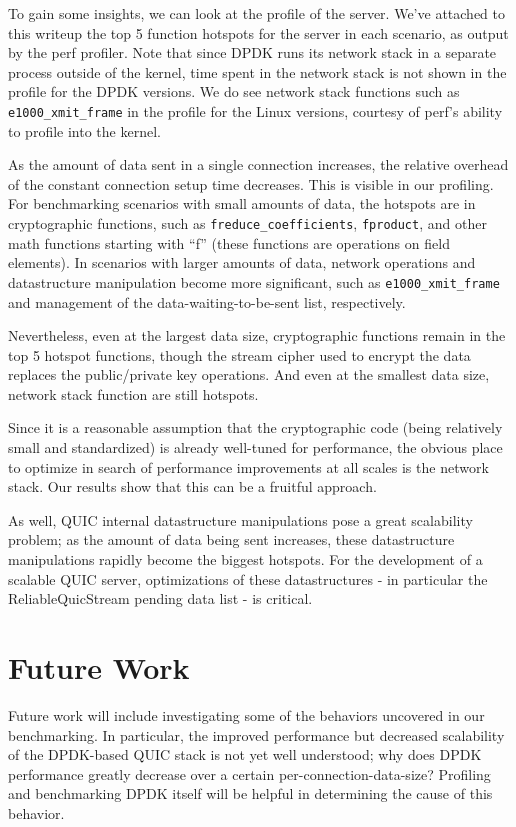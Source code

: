 \documentclass{sig-alternate-05-2015}
\begin{document}
To gain some insights, we can look at the profile of the server.
We've attached to this writeup the top 5 function hotspots for the server in each scenario,
as output by the perf profiler.
Note that since DPDK runs its network stack in a separate process outside of the kernel,
time spent in the network stack is not shown in the profile for the DPDK versions.
We do see network stack functions such as \verb|e1000_xmit_frame| in the profile for the Linux versions,
courtesy of perf's ability to profile into the kernel.

As the amount of data sent in a single connection increases,
the relative overhead of the constant connection setup time decreases.
This is visible in our profiling.
For benchmarking scenarios with small amounts of data, the hotspots are in cryptographic functions,
such as \verb|freduce_coefficients|, \verb|fproduct|, and other math functions starting with ``f''
(these functions are operations on field elements).
In scenarios with larger amounts of data,
network operations and datastructure manipulation become more significant,
such as \verb|e1000_xmit_frame| and management of the data-waiting-to-be-sent list, respectively.

Nevertheless, even at the largest data size,
cryptographic functions remain in the top 5 hotspot functions,
though the stream cipher used to encrypt the data replaces the public/private key operations.
And even at the smallest data size,
network stack function are still hotspots.

Since it is a reasonable assumption that the cryptographic code 
(being relatively small and standardized)
is already well-tuned for performance,
the obvious place to optimize in search of performance improvements at all scales is the network stack.
Our results show that this can be a fruitful approach.

As well, QUIC internal datastructure manipulations pose a great scalability problem;
as the amount of data being sent increases,
these datastructure manipulations rapidly become the biggest hotspots.
For the development of a scalable QUIC server, optimizations of these datastructures
- in particular the ReliableQuicStream pending data list -
is critical.

\section{Future Work}

Future work will include investigating some of the behaviors uncovered in our benchmarking.
In particular, the improved performance but decreased scalability of the DPDK-based QUIC stack
is not yet well understood;
why does DPDK performance greatly decrease over a certain per-connection-data-size?
Profiling and benchmarking DPDK itself will be helpful in determining the cause of this behavior.
\end{document}
